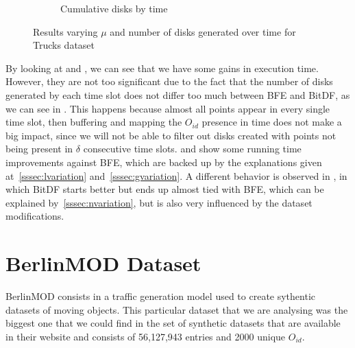 \begin{figure}[h!]
\begin{subfigure}[t]{0.48\textwidth}
        \caption{Cumulative disks by time}
        \label{fig:trucks_disks}
    \end{subfigure}
    \caption{Results varying $\mu$ and number of disks generated over time for Trucks dataset}
    \label{fig:trucks_results2}
\end{figure}

By looking at  and , we can see that we have some gains in
execution time. However, they are not too significant due to the fact that the number of disks generated by each time
slot does not differ too much between BFE and BitDF, as we can see in . This happens because
almost all points appear in every single time slot, then buffering and mapping the $O_{id}$ presence in time does not
make a big impact, since we will not be able to filter out disks created with points not being present in $\delta$
consecutive time slots.   and  show some running time improvements
against BFE, which are backed up by the explanations given at~\ref{sssec:lvariation} and~\ref{sssec:gvariation}. A
different behavior is observed in , in which BitDF starts better but ends up almost tied with
BFE, which can be explained by~\ref{sssec:nvariation}, but is also very influenced by the dataset modifications.

\section{BerlinMOD Dataset}
\label{subsec:berlinmod}
BerlinMOD consists in a traffic generation model \citep{berlinmodpaper} used to create sythentic datasets of moving
objects. This particular dataset that we are analysing was the biggest one that we could find in the set of synthetic
datasets that are available in their website \citep{berlinmod} and consists of 56,127,943 entries and 2000 unique
$O_{id}$.

